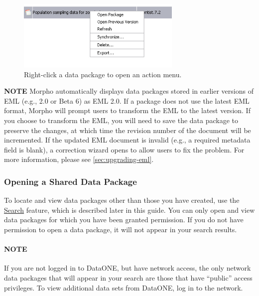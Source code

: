 \begin{figure}
  \centering
    \includegraphics[width=0.7\textwidth]{images/menu-dp-rightclick.jpg}
  \caption{Right-click a data package to open an action menu.}
  \label{fig:menu-dp-rightclick}
\end{figure}

\begin{shaded}
  \textbf{NOTE} Morpho automatically displays data packages stored in
  earlier versions of EML (e.g., 2.0 or Beta 6) as EML 2.0. If a package
  does not use the latest EML format, Morpho will prompt users to
  transform the EML to the latest version. If you choose to transform
  the EML, you will need to save the data package to preserve the
  changes, at which time the revision number of the document will be
  incremented. If the updated EML document is invalid (e.g., a required
  metadata field is blank), a correction wizard opens to allow users to
  fix the problem. For more information, please see
  \autoref{sec:upgrading-eml}.
\end{shaded}

\subsubsection{Opening a Shared Data Package}

To locate and view data packages other than those you have created, use
the \hyperref[sec:searching]{Search} feature, which is described later
in this guide. You can only open and view data packages for which you
have been granted permission. If you do not have permission to open a
data package, it will not appear in your search results. 

\paragraph{NOTE}
If you are not logged in to DataONE, but have network access, the only
network data packages that will appear in your search are those that
have ``public'' access privileges. To view additional data sets from 
DataONE, log in to the network.


